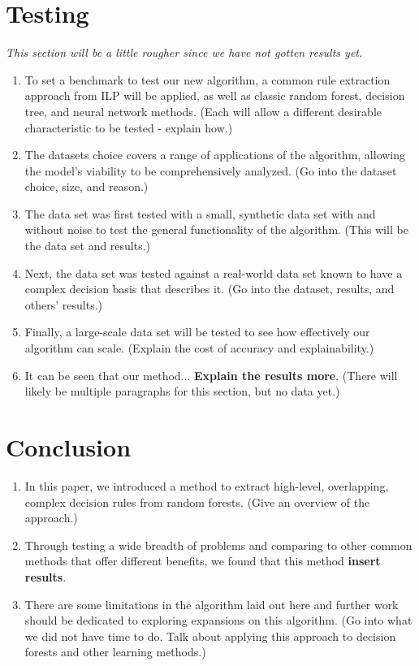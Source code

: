 \documentclass[twoside,11pt]{article}
\begin{document}
\section{Testing}
\textit{This section will be a little rougher since we have not gotten results yet.}
\begin{enumerate}
\item To set a benchmark to test our new algorithm, a common rule extraction approach from ILP will be applied, as well as classic random forest, decision tree, and neural network methods. (Each will allow a different desirable characteristic to be tested - explain how.)
\item The datasets choice covers a range of applications of the algorithm, allowing the model's viability to be comprehensively analyzed. (Go into the dataset choice, size, and reason.)
\item The data set was first tested with a small, synthetic data set with and without noise to test the general functionality of the algorithm. (This will be the data set and results.)
\item Next, the data set was tested against a real-world data set known to have a complex decision basis that describes it. (Go into the dataset, results, and others' results.)
\item Finally, a large-scale data set will be tested to see how effectively our algorithm can scale. (Explain the cost of accuracy and explainability.)
\item It can be seen that our method... \textbf{Explain the results more}. (There will likely be multiple paragraphs for this section, but no data yet.)
\end{enumerate}

\section{Conclusion}
\begin{enumerate}
\item In this paper, we introduced a method to extract high-level, overlapping, complex decision rules from random forests. (Give an overview of the approach.)
\item Through testing a wide breadth of problems and comparing to other common methods that offer different benefits, we found that this method \textbf{insert results}.
\item There are some limitations in the algorithm laid out here and further work should be dedicated to exploring expansions on this algorithm. (Go into what we did not have time to do. Talk about applying this approach to decision forests and other learning methods.) 
\end{enumerate}
\end{document}
